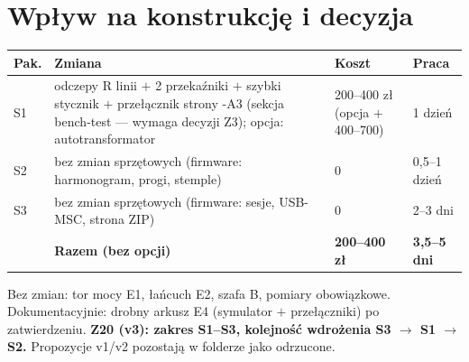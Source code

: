 \documentclass[11pt,a4paper]{article}
\begin{document}
\section{Wpływ na konstrukcję i decyzja}
\begin{longtable}{@{}p{}p{}p{}p{}@{}}
\toprule
\textbf{Pak.} & \textbf{Zmiana} & \textbf{Koszt} & \textbf{Praca}\\
\midrule
S1 & odczepy R linii $+$ 2 przekaźniki $+$ szybki stycznik $+$ przełącznik strony -A3 (sekcja
bench-test --- wymaga decyzji Z3); opcja: autotransformator & 200--400 zł (opcja $+$400--700) & 1 dzień\\
S2 & bez zmian sprzętowych (firmware: harmonogram, progi, stemple) & 0 & 0,5--1 dzień\\
S3 & bez zmian sprzętowych (firmware: sesje, USB-MSC, strona ZIP) & 0 & 2--3 dni\\
\midrule
 & \textbf{Razem (bez opcji)} & \textbf{200--400 zł} & \textbf{3,5--5 dni}\\
\bottomrule
\end{longtable}
Bez zmian: tor mocy E1, łańcuch E2, szafa B, pomiary obowiązkowe. Dokumentacyjnie: drobny arkusz
E4 (symulator $+$ przełączniki) po zatwierdzeniu. \textbf{Z20 (v3): zakres S1--S3, kolejność
wdrożenia S3 $\to$ S1 $\to$ S2.} Propozycje v1/v2 pozostają w folderze jako odrzucone.
\end{document}
